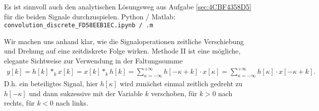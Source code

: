 %
Es ist sinnvoll auch den analytischen Lösungsweg aus Aufgabe \ref{sec:4CBF4358D5}
für die beiden Signale durchzuspielen.
Python / Matlab: \texttt{convolution\_discrete\_FD58EEB1EC.ipynb / .m}
\begin{Werkzeug}
Wir machen uns anhand  klar, wie die Signaloperationen
zeitliche Verschiebung und Drehung auf eine zeitdiskrete Folge wirken. Methode II
ist eine mögliche, elegante Sichtweise zur Verwendung in der Faltungssumme
\begin{align}
y[k]
= h[k] \ast_k x[k]
= x[k] \ast_k h[k]
= \sum_{\kappa=-\infty}^{+\infty} h[-\kappa + k] \cdot x[\kappa]
= \sum_{\kappa=-\infty}^{+\infty} h[\kappa] \cdot x[-\kappa + k].
\end{align}
D.h. ein beteiligtes Signal,
hier $h[\kappa]$ wird zunächst einmal zeitlich gedreht zu $h[-\kappa]$ und
dann sukzessive mit der Variable $k$ verschoben, für $k>0$ nach rechts, für
$k<0$ nach links.
\end{Werkzeug}
%
